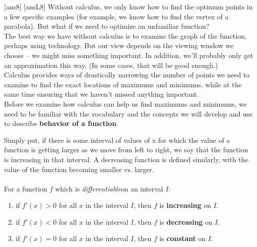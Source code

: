 \newpage
[ans8]
[ansL8]
\noindent Without calculus, we only know how to find the optimum points in a few specific examples (for example, we know how to find the vertex of a parabola). But what if we need to optimize an unfamiliar function?\\
The best way we have without calculus is to examine the graph of the function, perhaps using technology. But our view depends on the viewing window we choose – we might miss something important. In addition, we’ll probably only get an approximation this way. (In some cases, that will be good enough.)\\
Calculus provides ways of drastically narrowing the number of points we need to examine to find the exact locations of maximums and minimums, while at the same time ensuring that we haven’t missed anything important.\\
Before we examine how calculus can help us find maximums and minimums, we need to be familiar with the vocabulary and the concepts we will develop and use to describe \textbf{behavior of a function}.\\

\begin{tcolorbox}[title = {Increasing and Decreasing Functions in an interval}]
    Simply put, if there is some interval of values of x for which the value of a function is getting larger as we move from left to right, we say that the function is increasing in that interval.  A decreasing function is defined similarly, with the value of the function becoming smaller vs. larger.\\\\
    For a function \(f\) which is \emph{differentiable}\footnotemark on an interval \(I\):
\renewcommand{\labelenumii}{\roman{enumii}}
\begin{enumerate}
    \item if \(f'(x)>0\) for all \(x\) in the interval \(I\), then \(f\) is \textbf{increasing} on \(I\).
     \item if \(f'(x)<0\) for all \(x\) in the interval \(I\), then \(f\) is \textbf{decreasing} on \(I\).
      \item if \(f'(x)=0\) for all \(x\) in the interval \(I\), then \(f\) is \textbf{constant} on \(I\).
\end{enumerate}
\end{tcolorbox}

